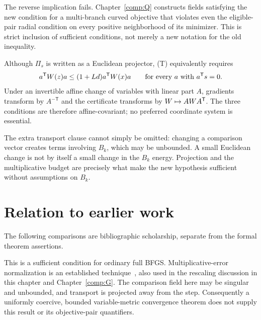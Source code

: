 The reverse implication fails. Chapter~\ref{comp:Q} constructs fields satisfying the new condition for a multi-branch curved objective that violates even the eligible-pair radial condition on every positive neighborhood of its minimizer. This is strict inclusion of sufficient conditions, not merely a new notation for the old inequality.

Although $\Pi_s$ is written as a Euclidean projector, (T) equivalently requires
\[
 a^{\mathsf T} W(z)a\le(1+Ld)a^{\mathsf T} W(x)a\qquad\text{for every }a\text{ with }a^{\mathsf T} s=0.
\]
Under an invertible affine change of variables with linear part $A$, gradients transform by $A^{-\mathsf T}$ and the certificate transforms by $W\mapsto AWA^{\mathsf T}$. The three conditions are therefore affine-covariant; no preferred coordinate system is essential.

The extra transport clause cannot simply be omitted: changing a comparison vector creates terms involving $B_k$, which may be unbounded. A small Euclidean change is not by itself a small change in the $B_k$ energy. Projection and the multiplicative budget are precisely what make the new hypothesis sufficient without assumptions on $B_k$.


\endgroup


\section*{Relation to earlier work}
The following comparisons are bibliographic scholarship, separate from the formal theorem assertions.

This is a sufficient condition for ordinary full BFGS. Multiplicative-error normalization is an established technique~\cite[Lemmas 2.2--2.3]{FND_CV13}, also used in the rescaling discussion in this chapter and Chapter~\ref{comp:G}. The comparison field here may be singular and unbounded, and transport is projected away from the step. Consequently a uniformly coercive, bounded variable-metric convergence theorem does not supply this result or its objective-pair quantifiers.
